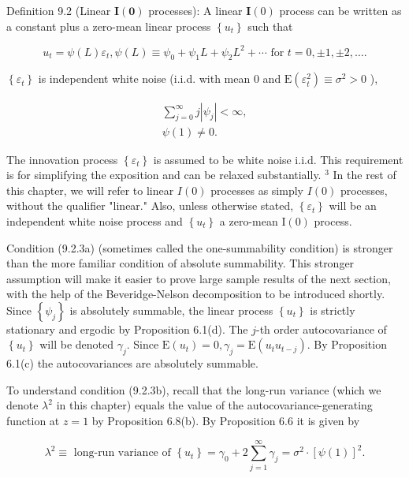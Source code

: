 \documentclass[10pt]{article}
\begin{document}
Definition 9.2 (Linear $\mathbf{I}(\mathbf{0})$ processes): A linear $\mathbf{I}(0)$ process can be written as a constant plus a zero-mean linear process $\left\{u_{t}\right\}$ such that


\begin{equation*}
u_{t}=\psi(L) \varepsilon_{t}, \psi(L) \equiv \psi_{0}+\psi_{1} L+\psi_{2} L^{2}+\cdots \text { for } t=0, \pm 1, \pm 2, \ldots . \tag{9.2.1}
\end{equation*}


$\left\{\varepsilon_{t}\right\}$ is independent white noise (i.i.d. with mean 0 and $\mathrm{E}\left(\varepsilon_{t}^{2}\right) \equiv \sigma^{2}>0$ ),


\begin{gather*}
\sum_{j=0}^{\infty} j\left|\psi_{j}\right|<\infty,  \tag{9.2.3a}\\
\psi(1) \neq 0 . \tag{9.2.3b}
\end{gather*}


The innovation process $\left\{\varepsilon_{t}\right\}$ is assumed to be white noise i.i.d. This requirement is for simplifying the exposition and can be relaxed substantially. ${ }^{3}$ In the rest of this chapter, we will refer to linear $I(0)$ processes as simply $I(0)$ processes, without the qualifier "linear." Also, unless otherwise stated, $\left\{\varepsilon_{t}\right\}$ will be an independent white noise process and $\left\{u_{t}\right\}$ a zero-mean $\mathrm{I}(0)$ process.

Condition (9.2.3a) (sometimes called the one-summability condition) is stronger than the more familiar condition of absolute summability. This stronger assumption will make it easier to prove large sample results of the next section, with the help of the Beveridge-Nelson decomposition to be introduced shortly. Since $\left\{\psi_{j}\right\}$ is absolutely summable, the linear process $\left\{u_{t}\right\}$ is strictly stationary and ergodic by Proposition 6.1(d). The $j$-th order autocovariance of $\left\{u_{t}\right\}$ will be denoted $\gamma_{j}$. Since $\mathrm{E}\left(u_{t}\right)=0, \gamma_{j}=\mathrm{E}\left(u_{t} u_{t-j}\right)$. By Proposition 6.1(c) the autocovariances are absolutely summable.

To understand condition (9.2.3b), recall that the long-run variance (which we denote $\lambda^{2}$ in this chapter) equals the value of the autocovariance-generating function at $z=1$ by Proposition 6.8(b). By Proposition 6.6 it is given by


\begin{equation*}
\lambda^{2} \equiv \text { long-run variance of }\left\{u_{t}\right\}=\gamma_{0}+2 \sum_{j=1}^{\infty} \gamma_{j}=\sigma^{2} \cdot[\psi(1)]^{2} . \tag{9.2.4}
\end{equation*}
\end{document}
